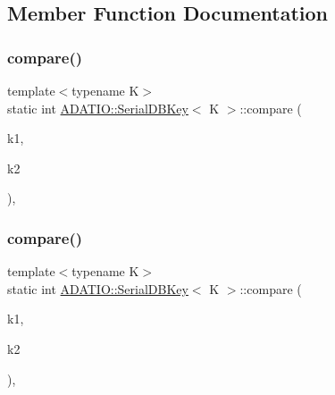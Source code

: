 \subsection{Member Function Documentation}
\mbox{\label{classADATIO_1_1SerialDBKey_a5f73c31df1c824c61790ab7645fc030f}} 
\subsubsection{\texorpdfstring{compare()}{compare()}\hspace{0.1cm}{\footnotesize\ttfamily [1/3]}}
{\footnotesize\ttfamily template$<$typename K$>$ \\
static int \mbox{\hyperlink{classADATIO_1_1SerialDBKey}{A\+D\+A\+T\+I\+O\+::\+Serial\+D\+B\+Key}}$<$ K $>$\+::compare (\begin{DoxyParamCaption}\item[{const \mbox{\hyperlink{adat-devel_2other__libs_2filedb_2filehash_2ffdb__db_8h_aa2e0984399491df0fdd20898ca8758f9}{F\+F\+D\+B\+\_\+\+D\+BT}} $\ast$}]{k1,  }\item[{const \mbox{\hyperlink{adat-devel_2other__libs_2filedb_2filehash_2ffdb__db_8h_aa2e0984399491df0fdd20898ca8758f9}{F\+F\+D\+B\+\_\+\+D\+BT}} $\ast$}]{k2 }\end{DoxyParamCaption})\hspace{0.3cm}{\ttfamily [inline]}, {\ttfamily [static]}}

\mbox{\label{classADATIO_1_1SerialDBKey_a5f73c31df1c824c61790ab7645fc030f}} 
\subsubsection{\texorpdfstring{compare()}{compare()}\hspace{0.1cm}{\footnotesize\ttfamily [2/3]}}
{\footnotesize\ttfamily template$<$typename K$>$ \\
static int \mbox{\hyperlink{classADATIO_1_1SerialDBKey}{A\+D\+A\+T\+I\+O\+::\+Serial\+D\+B\+Key}}$<$ K $>$\+::compare (\begin{DoxyParamCaption}\item[{const \mbox{\hyperlink{adat-devel_2other__libs_2filedb_2filehash_2ffdb__db_8h_aa2e0984399491df0fdd20898ca8758f9}{F\+F\+D\+B\+\_\+\+D\+BT}} $\ast$}]{k1,  }\item[{const \mbox{\hyperlink{adat-devel_2other__libs_2filedb_2filehash_2ffdb__db_8h_aa2e0984399491df0fdd20898ca8758f9}{F\+F\+D\+B\+\_\+\+D\+BT}} $\ast$}]{k2 }\end{DoxyParamCaption})\hspace{0.3cm}{\ttfamily [inline]}, {\ttfamily [static]}}

